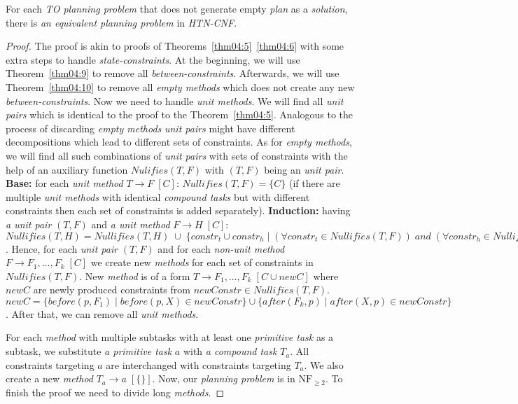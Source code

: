 \begin{thm}\label{thm04:12}
    For each \emph{TO planning problem} that does not generate empty \emph{plan} as a \emph{solution}, there is \emph{an equivalent planning problem} in \emph{HTN-CNF}.
\end{thm}
\begin{proof}
    The proof is akin to proofs of Theorems~\ref{thm04:5}~\ref{thm04:6} with some extra steps to handle \emph{state-constraints}. At the beginning, we will use Theorem~\ref{thm04:9} to remove all \emph{between-constraints}. Afterwards, we will use Theorem~\ref{thm04:10} to remove all \emph{empty methods} which does not create any new \emph{between-constraints}. Now we need to handle \emph{unit methods}. We will find all \emph{unit pairs} which is identical to the proof to the Theorem~\ref{thm04:5}. Analogous to the process of discarding \emph{empty methods} \emph{unit pairs} might have different decompositions which lead to different sets of constraints. As for \emph{empty methods}, we will find all such combinations of \emph{unit pairs} with sets of constraints with the help of an auxiliary function $Nulifies(T, F)$ with $(T, F)$ being an \emph{unit pair}. \textbf{Base:} for each \emph{unit method} $T \rightarrow F \; [C]$: $Nullifies(T, F) = \{C\}$ (if there are multiple \emph{unit methods} with identical \emph{compound tasks} but with different constraints then each set of constraints is added separately). \textbf{Induction:} having \emph{a unit pair} $(T, F)$ and \emph{a unit method} $F \rightarrow H \; [C]$: $Nullifies(T, H) = Nullifies(T, H) \; \cup \; \{constr_t \cup constr_h \; | \; (\forall constr_t \in Nullifies(T, F)) \; and \; (\forall constr_h \in Nullifies(F, H))\}$. Hence, for each \emph{unit pair} $(T, F)$ and for each \emph{non-unit method} $F \rightarrow F_1, \dots, F_k \; [C]$ we create new \emph{methods} for each set of constraints in $Nullifies(T, F)$. New \emph{method} is of a form $T \rightarrow F_1, \dots, F_k \; [C \cup newC]$ where $newC$ are newly produced constraints from $newConstr \in Nullifies(T, F)$. $newC = \{before(p, F_1) \; | \; before(p, X) \in newConstr\} \cup \{after(F_k, p) \; | \; after(X, p) \in newConstr\}$. After that, we can remove all \emph{unit methods}.

    For each \emph{method} with multiple subtasks with at least one \emph{primitive task} as a subtask, we substitute \emph{a primitive task} $a$ with \emph{a compound task} $T_a$. All constraints targeting $a$ are interchanged with constraints targeting $T_a$. We also create a new \emph{method} $T_a \rightarrow a \; [\{\}]$. Now, our \emph{planning problem} is in $\text{NF}_{\geq 2}$. To finish the proof we need to divide long \emph{methods}.


\end{proof}
